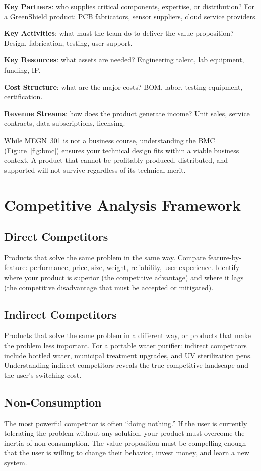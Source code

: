 \textbf{Key Partners}: who supplies critical components, expertise, or distribution? For a GreenShield product: PCB fabricators, sensor suppliers, cloud service providers.

\textbf{Key Activities}: what must the team do to deliver the value proposition? Design, fabrication, testing, user support.

\textbf{Key Resources}: what assets are needed? Engineering talent, lab equipment, funding, IP.

\textbf{Cost Structure}: what are the major costs? BOM, labor, testing equipment, certification.

\textbf{Revenue Streams}: how does the product generate income? Unit sales, service contracts, data subscriptions, licensing.

While MEGN~301 is not a business course, understanding the BMC (Figure~\ref{fig:bmc}) ensures your technical design fits within a viable business context. A product that cannot be profitably produced, distributed, and supported will not survive regardless of its technical merit.

\section{Competitive Analysis Framework}
\subsection{Direct Competitors}
Products that solve the same problem in the same way. Compare feature-by-feature: performance, price, size, weight, reliability, user experience. Identify where your product is superior (the competitive advantage) and where it lags (the competitive disadvantage that must be accepted or mitigated).

\subsection{Indirect Competitors}
Products that solve the same problem in a different way, or products that make the problem less important. For a portable water purifier: indirect competitors include bottled water, municipal treatment upgrades, and UV sterilization pens. Understanding indirect competitors reveals the true competitive landscape and the user's switching cost.

\subsection{Non-Consumption}
The most powerful competitor is often ``doing nothing.'' If the user is currently tolerating the problem without any solution, your product must overcome the inertia of non-consumption. The value proposition must be compelling enough that the user is willing to change their behavior, invest money, and learn a new system.

